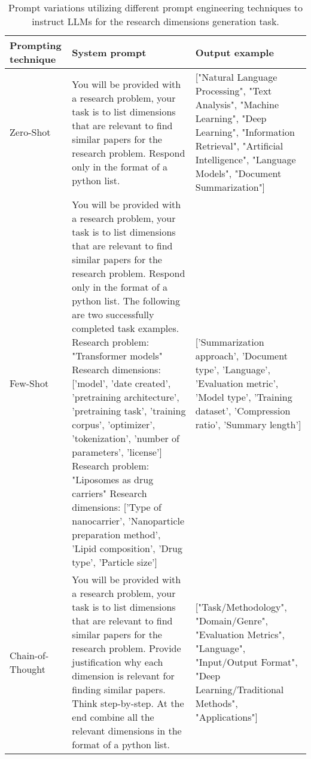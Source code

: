 \begin{table}[!htb] 
\caption{Prompt variations utilizing different prompt engineering techniques to instruct LLMs for the research dimensions generation task.\label{table prompts}}
\begin{tabular}{|p{1.8cm}|p{7cm}|p{3.1cm}|}
\hline
\textbf{Prompting technique}	& \textbf{System prompt}	& \textbf{Output example}\\
\hline
Zero-Shot & 
You will be provided with a research problem, your task is to list dimensions that are relevant to find similar papers for the research problem. Respond only in the format of a python list. & 

["Natural Language Processing", "Text Analysis", "Machine Learning", "Deep Learning", "Information Retrieval", "Artificial Intelligence", "Language Models", "Document Summarization"] \\ \hline

Few-Shot & 
You will be provided with a research problem, your task is to list dimensions that are relevant to find similar papers for the research problem. Respond only in the format of a python list. \newline 
The following are two successfully completed task examples. \newline
Research problem: "Transformer models" \newline
Research dimensions: ['model', 'date created', 'pretraining architecture', 'pretraining task', 'training corpus', 'optimizer', 'tokenization', 'number of parameters', 'license'] \newline
Research problem: "Liposomes as drug carriers" \newline
Research dimensions: ['Type of nanocarrier', 'Nanoparticle preparation method', 'Lipid composition', 'Drug type', 'Particle size'] & 

['Summarization approach', 'Document type', 'Language', 'Evaluation metric', 'Model type', 'Training dataset', 'Compression ratio', 'Summary length'] \\ \hline

Chain-of-Thought & 
You will be provided with a research problem, your task is to list dimensions that are relevant to find similar papers for the research problem. Provide justification why each dimension is relevant for finding similar papers. Think step-by-step. At the end combine all the relevant dimensions in the format of a python list. & 

["Task/Methodology", "Domain/Genre", "Evaluation Metrics", "Language", "Input/Output Format", "Deep Learning/Traditional Methods", "Applications"] \\

\hline
\end{tabular}
\end{table}

